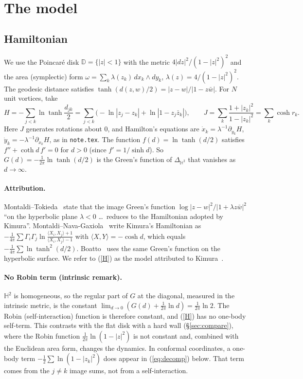\documentclass[11pt]{article}
\theoremstyle{remark}
\newcommand{\D}{\mathbb D}
\begin{document}
\section{The model}
\subsection{Hamiltonian}
We use the Poincar\'e disk $\D=\{|z|<1\}$ with the metric $4|dz|^2/(1-|z|^2)^2$ and the area (symplectic) form
$\omega=\sum_k\lambda(z_k)\,dx_k\wedge dy_k$, $\lambda(z)=4/(1-|z|^2)^2$. The geodesic distance satisfies
$\tanh(d(z,w)/2)=|z-w|/|1-z\bar w|$. For $N$ unit vortices, take
\begin{equation}\label{H}
H=-\sum_{j<k}\ln\tanh\frac{d_{jk}}2=\sum_{j<k}\Big(-\ln|z_j-z_k|+\ln|1-z_j\bar z_k|\Big),
\qquad J=\sum_k\frac{1+|z_k|^2}{1-|z_k|^2}=\sum_k\cosh r_k .
\end{equation}
Here $J$ generates rotations about $0$, and Hamilton's equations are $\dot x_k=\lambda^{-1}\partial_{y_k}H$,
$\dot y_k=-\lambda^{-1}\partial_{x_k}H$, as in \texttt{note.tex}. The function $f(d)=\ln\tanh(d/2)$ satisfies
$f''+\coth d\,f'=0$ for $d>0$ (since $f'=1/\sinh d$). So $G(d)=-\frac1{2\pi}\ln\tanh(d/2)$ is the Green's function of
$\Delta_{\mathbb H^2}$ that vanishes as $d\to\infty$.

\paragraph{Attribution.} Montaldi--Tokieda~\cite[\S4.2]{MT} state that the image Green's function
$\log|z-w|^2/|1+\lambda z\bar w|^2$ ``on the hyperbolic plane $\lambda<0$ \dots\ reduces to the Hamiltonian adopted by
Kimura''. Montaldi--Nava-Gaxiola~\cite[eq.~(12)]{MNG} write Kimura's Hamiltonian as
$-\frac1{4\pi}\sum\Gamma_i\Gamma_j\ln\frac{\langle X_i,X_j\rangle+1}{\langle X_i,X_j\rangle-1}$ with $\langle X,Y\rangle=-\cosh d$,
which equals $-\frac1{4\pi}\sum\ln\tanh^2(d/2)$. Boatto~\cite{Boatto} uses the same Green's function on the hyperbolic
surface. We refer to (\ref{H}) as the model attributed to Kimura~\cite{Kimura}.

\paragraph{No Robin term (intrinsic remark).} $\mathbb H^2$ is homogeneous, so the regular part of $G$ at the diagonal,
measured in the intrinsic metric, is the constant $\lim_{d\to0}(G(d)+\frac1{2\pi}\ln d)=\frac1{2\pi}\ln2$. The
Robin (self-interaction) function is therefore constant, and (\ref{H}) has no one-body self-term. This contrasts with the flat
disk with a hard wall (\S\ref{sec:compare}), where the Robin function $\frac1{2\pi}\ln(1-|z|^2)$ is not constant and,
combined with the Euclidean area form, changes the dynamics. In conformal coordinates, a one-body term
$-\frac12\sum\ln(1-|z_k|^2)$ does appear in (\ref{eq:decomp}) below. That term comes from the $j\neq k$ image sums, not
from a self-interaction.
\end{document}
